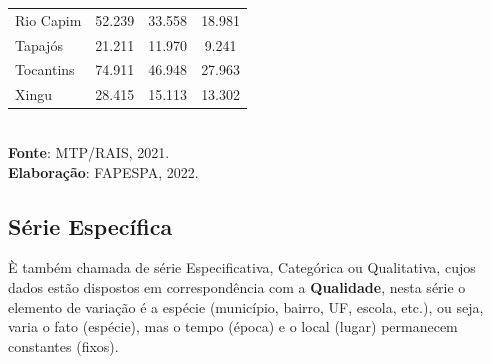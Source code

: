 \begin{table}[H]
{\begin{tabular}{l|c|c|c}
Rio Capim                  &  52.239                                    &  33.558                       &   18.981                           \\
Tapajós                    &  21.211                                    &  11.970                       &   9.241                           \\
Tocantins                  &  74.911                                    &  46.948                       &   27.963                           \\
Xingu                      &  28.415                                    &  15.113                       &   13.302                           \\ \hline\hline
\end{tabular}}
\\ 
\hspace{-6.9cm}
\textbf{Fonte}: MTP/RAIS, 2021. \\
\hspace{-6.2cm}
\textbf{Elaboração}: FAPESPA, 2022.
\end{table}

\newpage
\subsection{Série Específica}

È também chamada de série Especificativa, Categórica ou Qualitativa, cujos dados estão dispostos em correspondência com a \textbf{Qualidade}, nesta série o elemento de variação é a espécie (município, bairro, UF, escola, etc.), ou seja, varia o fato (espécie), mas o tempo (época) e o local (lugar) permanecem constantes (fixos).


